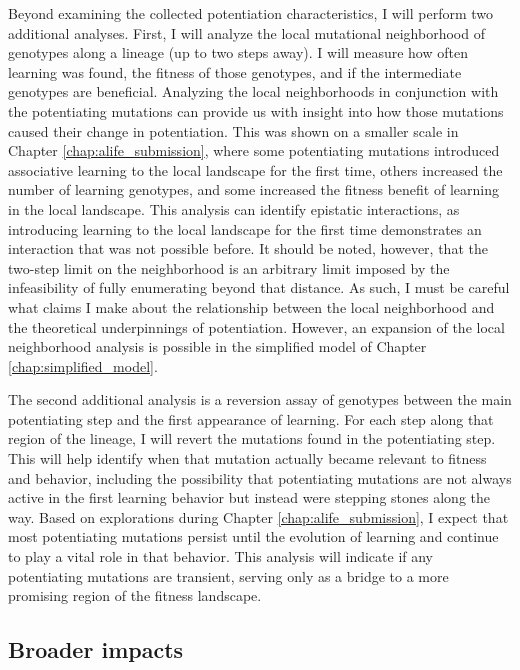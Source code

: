 Beyond examining the collected potentiation characteristics, I will perform two additional analyses. 
First, I will analyze the local mutational neighborhood of genotypes along a lineage (up to two steps away). 
I will measure how often learning was found, the fitness of those genotypes, and if the intermediate genotypes are beneficial. 
Analyzing the local neighborhoods in conjunction with the potentiating mutations can provide us with insight into how those mutations caused their change in  potentiation. 
This was shown on a smaller scale in Chapter \ref{chap:alife_submission}, where some potentiating mutations introduced associative learning to the local landscape for the first time, others increased the number of learning genotypes, and some increased the fitness benefit of learning in the local landscape. 
This analysis can identify epistatic interactions, as introducing learning to the local landscape for the first time demonstrates an interaction that was not possible before. 
It should be noted, however, that the two-step limit on the neighborhood is an arbitrary limit imposed by the infeasibility of fully enumerating beyond that distance. 
As such, I must be careful what claims I make about the relationship between the local neighborhood and the theoretical underpinnings of potentiation. 
However, an expansion of the local neighborhood analysis is possible in the simplified model of Chapter \ref{chap:simplified_model}.

The second additional analysis is a reversion assay of genotypes between the main potentiating step and the first appearance of learning. 
For each step along that region of the lineage, I will revert the mutations found in the potentiating step. 
This will help identify when that mutation actually became relevant to fitness and behavior, including the possibility that potentiating mutations are not always active in the first learning behavior but instead were stepping stones along the way.
Based on explorations during Chapter \ref{chap:alife_submission}, I expect that most potentiating mutations persist until the evolution of learning and continue to play a vital role in that behavior. 
This analysis will indicate if any potentiating mutations are transient, serving only as a bridge to a more promising region of the fitness landscape. 

 \subsection{Broader impacts}


